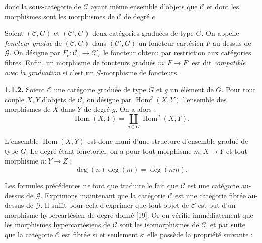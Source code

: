 %
%
donc la sous-catégorie de $\mathcal C$ ayant même ensemble d'objets que
$\mathcal C$ et dont les morphismes sont les morphismes de $\mathcal C$ de
degré $e$.

Soient $(\mathcal C,G)$ et $(\mathcal C',G)$ deux catégories graduées de
type $G$. On appelle \emph{foncteur gradué} de $(\mathcal C,G)$ dans
$(\mathcal C',G)$ un foncteur cartésien
$F$ au-dessus de $\mathcal G$. On désigne par
$F_e\colon\mathcal C_e\to\mathcal C'_e$ le foncteur obtenu par restriction
aux catégories fibres.
Enfin, un morphisme de foncteurs gradués $m\colon F\to F'$ est dit
\emph{compatible avec la graduation} si c'est un
$\mathcal G$-morphisme de foncteurs.

\noindent\textbf{1.1.2.}\quad
Soient $\mathcal C$ une catégorie graduée de type $G$ et $g$ un élément de
$G$. Pour tout couple $X,Y$ d'objets de $\mathcal C$, on désigne par
%
$\operatorname{Hom}^{g}(X,Y)$ l'ensemble des morphismes de $X$ dans $Y$ de
degré $g$. On a alors :
\begingroup
\makeatletter
\tagsleft@true
\let\veqno\@@leqno
\makeatother
\begin{equation}
  \operatorname{Hom}(X,Y)
  =\coprod_{g\in G}\operatorname{Hom}^{g}(X,Y).
  \tag{1.1.2.1}
\end{equation}
\endgroup

L'ensemble $\operatorname{Hom}(X,Y)$ est donc muni d'une structure
d'ensemble gradué de type $G$. Le degré étant fonctoriel, on a pour tout
morphisme $m\colon X\to Y$ et tout morphisme $n\colon Y\to Z$ :
\begin{equation}
  \deg(n)\deg(m)=\deg(nm).
  \tag{1.1.2.2}
\end{equation}

Les formules précédentes ne font que traduire le fait que $\mathcal C$ est
une catégorie au-dessus de $\mathcal G$. Exprimons maintenant que la
catégorie $\mathcal C$ est une catégorie fibrée au-dessus de $\mathcal G$.
Il suffit pour cela d'exprimer que tout objet de $\mathcal C$ est but d'un
morphisme hypercartésien de degré donné [19]. Or on vérifie immédiatement
que les morphismes hypercartésiens de $\mathcal C$ sont les isomorphismes
de $\mathcal C$, et par suite que la catégorie $\mathcal C$ est fibrée si
et seulement si elle possède la propriété suivante :

